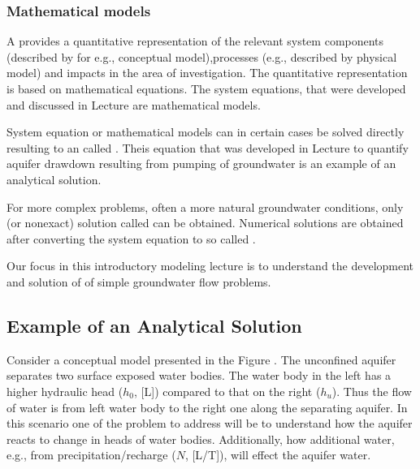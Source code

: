 \documentclass[letterpaper,10pt,english]{jupyterBook}
\begin{document}
\subsubsection{Mathematical models}
\label{\detokenize{content/modeling/31_intro_modeling:mathematical-models}}
\sphinxAtStartPar
A  provides a quantitative representation of the relevant system components (described by for e.g., conceptual model),processes (e.g., described by physical model) and impacts in the area of investigation. The quantitative representation is based on mathematical equations. The system equations, that were developed and discussed in Lecture  are mathematical models.

\sphinxAtStartPar
System equation or mathematical models can in certain cases be solved directly resulting to an  called . Theis equation that was developed in Lecture  to quantify aquifer drawdown resulting from pumping of groundwater is an example of an analytical solution.

\sphinxAtStartPar
For more complex problems, often a more natural groundwater conditions, only  (or non\sphinxhyphen{}exact) solution called  can be  obtained. Numerical solutions are obtained after converting the system equation to so called .

\sphinxAtStartPar
Our focus in this introductory modeling lecture is to understand the development and solution of  of simple groundwater flow problems.


\subsection{Example of an Analytical Solution}
\label{\detokenize{content/modeling/31_intro_modeling:example-of-an-analytical-solution}}
\sphinxAtStartPar
Consider a conceptual model presented in the Figure {\hyperref[\detokenize{content/tools/1D_ditchflow:ditch}]{}}. The unconfined aquifer separates two surface exposed water bodies. The water body in the left has a higher hydraulic head (\(h_0\), {[}L{]}) compared to that on the right (\(h_u\)). Thus the flow of water is from left water body to the right one along the separating aquifer. In this scenario one of the problem to address will be to understand how the aquifer reacts to change in heads of water bodies. Additionally, how additional water, e.g., from precipitation/recharge (\(N\), {[}L/T{]}), will effect the aquifer water.
\end{document}
